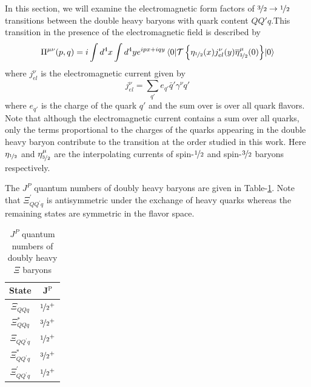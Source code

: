 \label{chp:sr12}

In this section, we will examine the electromagnetic form factors of $\nicefrac{3}{2}\rightarrow\nicefrac{1}{2}$ transitions between the double heavy baryons with quark content $QQ'q$.This transition in the presence of the electromagnetic field is described by
\begin{align}
    \Pi^{\mu\nu}(p,q) = i\int d^4x \int d^4y e^{ipx+iqy}\mel{0}{\mathcal{T}\left\{\eta_{\nicefrac{1}{2}}(x)j_{el}^\nu(y)\overline{\eta}^\mu_{\nicefrac{3}{2}}(0)\right\}}{0}
    \label{initial_corr}
\end{align}
%
where $j_{el}^\nu$ is the electromagnetic current given by
%
\begin{equation}
    j_{el}^\nu = \sum_{q'} e_{q'} \bar q' \gamma^\nu q'
\end{equation}
where $e_{q'}$ is the charge of the quark $q'$ and the sum over is over all quark flavors. Note that although the electromagnetic current contains a sum over all quarks, only the terms proportional to the charges of the quarks appearing in the double heavy baryon contribute to the transition at the order studied in this work. Here $\eta_{\nicefrac{1}{2}}$ and $\eta^\mu_{\nicefrac{3}{2}}$ are the interpolating currents of spin-$\nicefrac{1}{2}$ and spin-$\nicefrac{3}{2}$ baryons respectively.

The $J^P$ quantum numbers of doubly heavy baryons are given in Table-\ref{baryontable}. Note that $\Xi^\prime_{QQ^\prime q}$ is antisymmetric under the exchange of heavy quarks whereas the remaining states are symmetric in the flavor space.

\begin{table}[h!]
    \centering
    \begin{tabular}{|c|c|}
        \hline
        State & J$^\text{P}$  \\
        \hline
        $\Xi_{QQq}$&$\nicefrac{1}{2}^+$\\
        \hline
        $\Xi_{QQq}^\ast$&$\nicefrac{3}{2}^+$\\
        \hline
        $\Xi_{QQ^\prime q}$&$\nicefrac{1}{2}^+$\\
        \hline
        $\Xi_{QQ^\prime q}^\ast$&$\nicefrac{3}{2}^+$\\
        \hline
        $\Xi^\prime_{QQ^\prime q}$&$\nicefrac{1}{2}^+$\\
        \hline
    \end{tabular}
    \caption{$J^P$ quantum numbers of doubly heavy $\Xi$ baryons}
    \label{baryontable}
\end{table}

